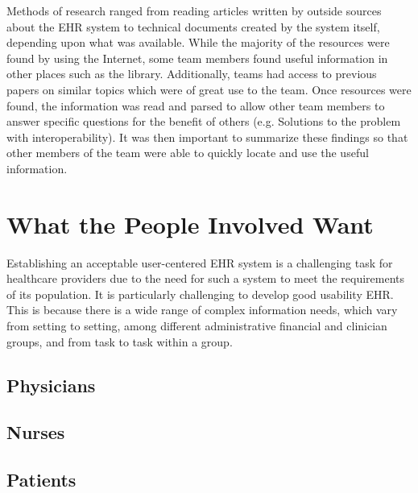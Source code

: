 \documentclass[14pt]{article}
\begin{document}
Methods of research ranged from reading articles written by outside sources about the \gls{EHR} system to technical documents created by the system itself, depending upon what was available.  While the majority of the resources were found by using the Internet, some team members found useful information in other places such as the library.  Additionally, teams had access to previous papers on similar topics which were of great use to the team.  Once resources were found, the information was read and parsed to allow other team members to answer specific questions for the benefit of others (e.g. Solutions to the problem with interoperability).  It was then important to summarize these findings so that other members of the team were able to quickly locate and use the useful information.


\newpage

\section{What the People Involved Want}
\label{sec:People}
Establishing an acceptable user-centered  \gls{EHR} system is a challenging task for healthcare providers due to the need for such a system to meet the requirements of its population. It is particularly challenging to develop good usability  \gls{EHR}. This is because there is a wide range of complex information needs, which vary from setting to setting, among different administrative financial and clinician groups, and from task to task within a group.

\subsection{Physicians}
\subsection{Nurses}
\subsection{Patients}
\end{document}

